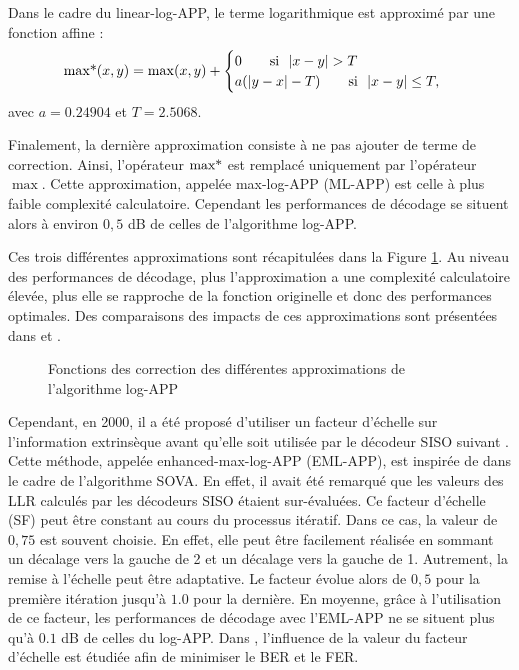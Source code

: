 Dans le cadre du linear-log-APP, le terme logarithmique est approximé par une fonction affine \cite{linearlog} : 
\begin{equation}
	\operatorname*{max*}(x,y)=\max(x,y) + \begin{cases} 0 \qquad\text{si~~} |x-y| > T \\
	a(|y-x|-T) \qquad\text{si~~} |x-y| \leq T, \end{cases}
\end{equation}
avec $a=0.24904$ et $T=2.5068$.

Finalement, la dernière approximation consiste à ne pas ajouter de terme de correction. Ainsi, l'opérateur $\operatorname*{max*}$ est 
remplacé uniquement par l'opérateur $\max$. Cette approximation, appelée max-log-APP (ML-APP) est celle à plus faible 
complexité calculatoire. Cependant les performances de décodage se situent alors à environ $0,5$ dB de celles de l'algorithme 
log-APP.

Ces trois différentes approximations sont récapitulées dans la Figure \ref{fig:logapprox}. Au niveau des performances de 
décodage, plus l'approximation a une complexité calculatoire élevée, plus elle se rapproche de la fonction originelle et 
donc des performances optimales. Des comparaisons des impacts de ces approximations sont présentées dans \cite{robertson1995comparison} et \cite{logapprox}.
\begin{figure}[!h]
	\centering
	
	\caption{\label{fig:logapprox} Fonctions des correction des différentes approximations de l'algorithme log-APP} 
\end{figure}

Cependant, en 2000, il a été proposé d'utiliser un facteur d'échelle sur l'information extrinsèque avant qu'elle soit 
utilisée par le décodeur SISO suivant \cite{enhancedmlmap}. Cette méthode, appelée enhanced-max-log-APP (EML-APP), est 
inspirée de \cite{HagenHoerViter} dans le cadre de l'algorithme SOVA. En effet, il avait été remarqué que les valeurs 
des LLR calculés par les décodeurs SISO étaient sur-évaluées.
Ce facteur d'échelle (SF) peut être constant au cours du processus itératif. Dans ce cas, la valeur de $0,75$ est 
souvent choisie. En effet, elle peut être facilement réalisée en sommant un décalage vers la gauche de 2 et un décalage 
vers la gauche de 1. Autrement, la remise à l'échelle peut être adaptative. Le facteur évolue alors de $0,5$ pour la 
première itération jusqu'à $1.0$ pour la dernière. En moyenne, grâce à l'utilisation de ce facteur, les performances de 
décodage avec l'EML-APP ne se situent plus qu'à $0.1$ dB de celles du log-APP.
Dans \cite{scaling}, l'influence de la valeur du facteur d'échelle est étudiée afin de minimiser le BER et le FER.


